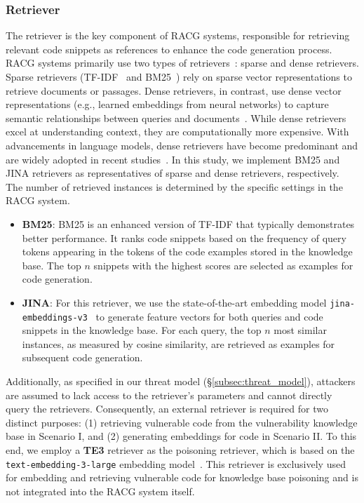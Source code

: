 \subsubsection{Retriever}  
The retriever is the key component of RACG systems, responsible for retrieving relevant code snippets as references to enhance the code generation process. RACG systems primarily use two types of retrievers~\cite{gao2024preference,wang2024coderag}: sparse and dense retrievers.  
Sparse retrievers (\eg TF-IDF~\cite{sparck1972statistical} and BM25~\cite{robertson2009probabilistic}) rely on sparse vector representations to retrieve documents or passages. Dense retrievers, in contrast, use dense vector representations (e.g., learned embeddings from neural networks) to capture semantic relationships between queries and documents~\cite{wang2024coderag,gao2024preference}. While dense retrievers excel at understanding context, they are computationally more expensive.  
With advancements in language models, dense retrievers have become predominant and are widely adopted in recent studies~\cite{parvez2021retrieval,gao2024preference,wang2023rap,wang2024coderag}.  
In this study, we implement BM25 and JINA retrievers as representatives of sparse and dense retrievers, respectively. The number of retrieved instances is determined by the specific settings in the RACG system.
\begin{itemize}[leftmargin=*]  
    \item {\bf BM25}: BM25 is an enhanced version of TF-IDF that typically demonstrates better performance. It ranks code snippets based on the frequency of query tokens appearing in the tokens of the code examples stored in the knowledge base. The top $n$ snippets with the highest scores are selected as examples for code generation.  
    \item {\bf JINA}: For this retriever, we use the state-of-the-art embedding model {\tt jina-embeddings-v3}~\cite{sturua2024jina} to generate feature vectors for both queries and code snippets in the knowledge base. For each query, the top $n$ most similar instances, as measured by cosine similarity, are retrieved as examples for subsequent code generation.  
\end{itemize}  

Additionally, as specified in our threat model (\S\ref{subsec:threat_model}), attackers are assumed to lack access to the retriever's parameters and cannot directly query the retrievers. Consequently, an external retriever is required for two distinct purposes: (1) retrieving vulnerable code from the vulnerability knowledge base in Scenario I, and (2) generating embeddings for code in Scenario II.  
To this end, we employ a {\bf TE3} retriever as the poisoning retriever, which is based on the \texttt{text-embedding-3-large} embedding model~\cite{OpenAI_Embeddings}. This retriever is exclusively used for embedding and retrieving vulnerable code for knowledge base poisoning and is not integrated into the RACG system itself.



